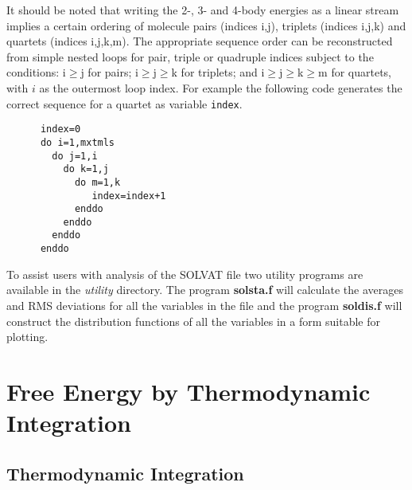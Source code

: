 It should be noted that writing the 2-, 3- and 4-body energies as a linear
stream implies a certain ordering of molecule pairs (indices i,j), triplets
(indices i,j,k) and quartets (indices i,j,k,m). The appropriate sequence order
can be reconstructed from simple nested loops for pair, triple or quadruple
indices subject to the conditions: i$\ge$j for pairs; i$\ge$j$\ge$k for
triplets; and i$\ge$j$\ge$k$\ge$m for quartets, with $i$ as the outermost
loop index.  For example the following code
generates the correct sequence for a quartet as variable {\tt index}.
\begin{verbatim}
      index=0
      do i=1,mxtmls
        do j=1,i
          do k=1,j
            do m=1,k
               index=index+1
            enddo
          enddo
        enddo
      enddo
\end{verbatim}
To assist users with analysis of the SOLVAT file two utility programs are
available in the {\em utility} directory. The program {\bf solsta.f} will
calculate the averages and RMS deviations for all the variables in the file
and the program {\bf soldis.f} will construct the distribution functions of
all the variables in a form suitable for plotting.

\section{Free Energy by Thermodynamic Integration}
\label{FEbyTI}
\subsection{Thermodynamic Integration}

